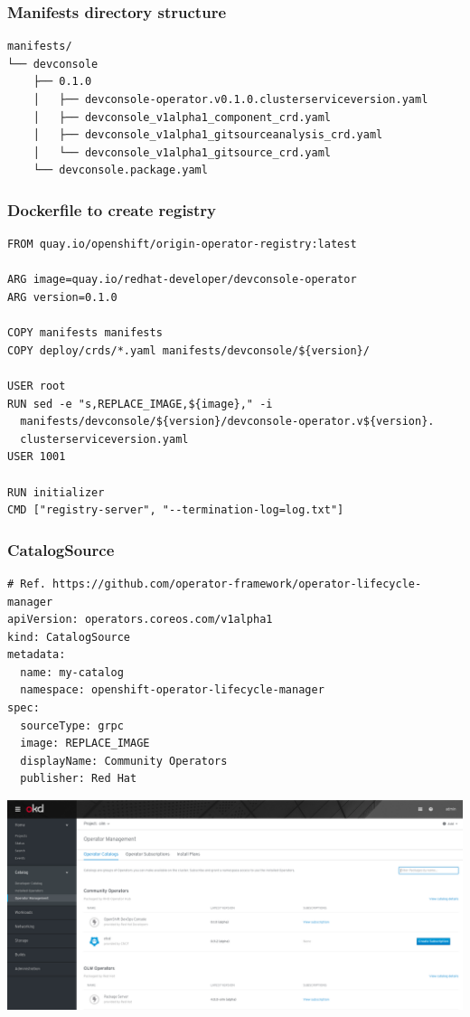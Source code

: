 \documentclass[aspectratio=169]{beamer}
\begin{document}
\begin{frame}[fragile]
  \frametitle{Manifests directory structure}

  \begin{Verbatim}[fontsize=\small]
manifests/
└── devconsole
    ├── 0.1.0
    │   ├── devconsole-operator.v0.1.0.clusterserviceversion.yaml
    │   ├── devconsole_v1alpha1_component_crd.yaml
    │   ├── devconsole_v1alpha1_gitsourceanalysis_crd.yaml
    │   └── devconsole_v1alpha1_gitsource_crd.yaml
    └── devconsole.package.yaml
  \end{Verbatim}
  
\end{frame}

\begin{frame}[fragile]
  \frametitle{Dockerfile to create registry}

  \begin{Verbatim}[fontsize=\small]
FROM quay.io/openshift/origin-operator-registry:latest

ARG image=quay.io/redhat-developer/devconsole-operator
ARG version=0.1.0

COPY manifests manifests
COPY deploy/crds/*.yaml manifests/devconsole/${version}/

USER root
RUN sed -e "s,REPLACE_IMAGE,${image}," -i
  manifests/devconsole/${version}/devconsole-operator.v${version}.
  clusterserviceversion.yaml
USER 1001

RUN initializer
CMD ["registry-server", "--termination-log=log.txt"]
  \end{Verbatim}
  
\end{frame}

\begin{frame}[fragile]
  \frametitle{CatalogSource}

  \begin{Verbatim}[fontsize=\small]
# Ref. https://github.com/operator-framework/operator-lifecycle-manager
apiVersion: operators.coreos.com/v1alpha1
kind: CatalogSource
metadata:
  name: my-catalog
  namespace: openshift-operator-lifecycle-manager
spec:
  sourceType: grpc
  image: REPLACE_IMAGE
  displayName: Community Operators
  publisher: Red Hat
  \end{Verbatim}
\end{frame}

\begin{frame}

  \includegraphics[scale=.20]{images/catsrc.png}

\end{frame}
\end{document}
